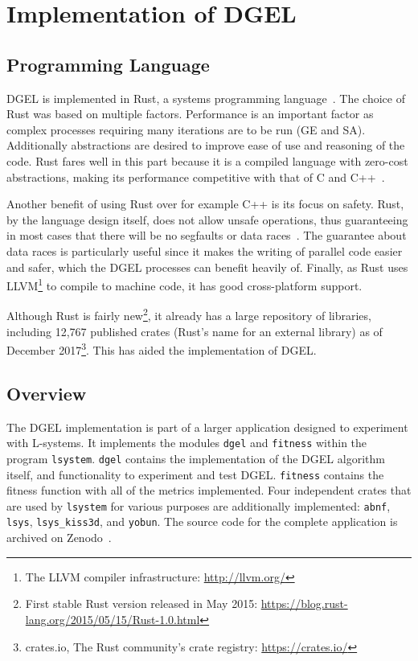 \chapter[Implementation of DGEL]{Implementation of \gls{DGEL}}
\section{Programming Language}
\gls{DGEL} is implemented in Rust, a systems programming language~\cite{Rust}.
The choice of Rust was based on multiple factors.
Performance is an important factor as complex processes requiring many iterations are to be run (\gls{GE} and \gls{SA}).
Additionally abstractions are desired to improve ease of use and reasoning of the code.
Rust fares well in this part because it is a compiled language with zero-cost abstractions, making its performance competitive with that of C and C++~\cite{RustFaq}.

Another benefit of using Rust over for example C++ is its focus on safety.
Rust, by the language design itself, does not allow unsafe operations, thus guaranteeing in most cases that there will be no segfaults or data races~\cite{RustSafe,Rust,RustRace}.
The guarantee about data races is particularly useful since it makes the writing of parallel code easier and safer, which the \gls{DGEL} processes can benefit heavily of.
Finally, as Rust uses LLVM\footnote{The LLVM compiler infrastructure: \url{http://llvm.org/}} to compile to machine code, it has good cross-platform support.

Although Rust is fairly new\footnote{First stable Rust version released in May 2015: \url{https://blog.rust-lang.org/2015/05/15/Rust-1.0.html}}, it already has a large repository of libraries, including 12,767 published crates (Rust's name for an external library) as of December 2017\footnote{crates.io, The Rust community’s crate registry: \url{https://crates.io/}}.
This has aided the implementation of \gls{DGEL}.

\section{Overview}
The \gls{DGEL} implementation is part of a larger application designed to experiment with \glspl{L-system}.
It implements the modules \texttt{dgel} and \texttt{fitness} within the program \texttt{lsystem}.
\texttt{dgel} contains the implementation of the \gls{DGEL} algorithm itself, and functionality to experiment and test \gls{DGEL}.
\texttt{fitness} contains the fitness function with all of the metrics implemented.
Four independent crates that are used by \texttt{lsystem} for various purposes are additionally implemented: \texttt{abnf}, \texttt{lsys}, \texttt{lsys\_kiss3d}, and \texttt{yobun}.
The source code for the complete application is archived on Zenodo~\cite{CodeLsystem}.

